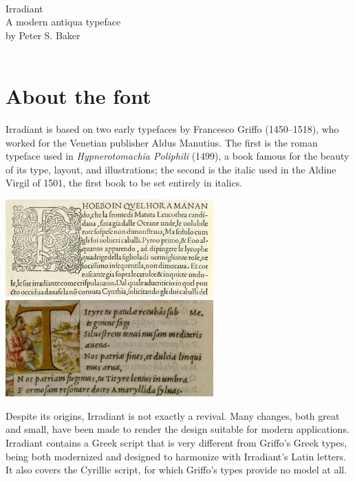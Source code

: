 \documentclass[12pt]{book}
\begin{document}
\begin{titlepage}
\hrulefill\\
\Huge \centering \textcolor{BrickRed}{Irradiant} \\[1cm]
\huge \centering A modern antiqua typeface \\[1cm]
\large \centering by {Peter S. Baker}\\[1cm]
\huge{} \\
\hrulefill
\end{titlepage}
\cleardoublepage

\section*{About the font}

Irradiant is based on two early typefaces by Francesco Griffo
(1450–1518), who worked for the Venetian publisher Aldus Manutius. The
first is the roman typeface used in \textit{Hypnerotomachia Poliphili}
(1499), a book famous for the beauty of its type, layout, and
illustrations; the second is the italic used in the Aldine Virgil of
1501, the first book to be set entirely in italics.

\begin{center}
\includegraphics[width=0.6\textwidth]{hypnerotomachia_sample}\\[1ex]

\includegraphics[width=0.6\textwidth]{Virgil_sample}
\end{center}

Despite its origins, Irradiant is not exactly a revival. Many changes,
both great and small, have been made to render the design suitable for modern
applications. Irradiant contains a Greek script that is very different
from Griffo's Greek types, being both modernized and designed to harmonize
with Irradiant's Latin letters. It also covers the Cyrillic script, for which 
Griffo’s types provide no model at all.
\end{document}
